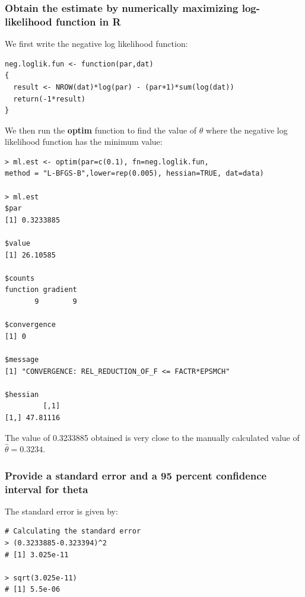 \documentclass[12pt,letterpaper,titlepage,en-US]{article}
\begin{document}
\subsubsection{Obtain the estimate by numerically maximizing log-likelihood function in R}
We first write the negative log likelihood function:
\begin{knitrout}
\color{fgcolor}
\begin{kframe}
\begin{verbatim}
neg.loglik.fun <- function(par,dat)
{ 
  result <- NROW(dat)*log(par) - (par+1)*sum(log(dat))
  return(-1*result)
}
\end{verbatim}
\end{kframe}
\end{knitrout}



We then run the \textbf{optim} function to find the value of $\theta$ where the negative log likelihood function has the minimum value:
\begin{knitrout}
\color{fgcolor}
\begin{kframe}
\begin{verbatim}
> ml.est <- optim(par=c(0.1), fn=neg.loglik.fun, 
method = "L-BFGS-B",lower=rep(0.005), hessian=TRUE, dat=data)

> ml.est
$par
[1] 0.3233885

$value
[1] 26.10585

$counts
function gradient 
       9        9 

$convergence
[1] 0

$message
[1] "CONVERGENCE: REL_REDUCTION_OF_F <= FACTR*EPSMCH"

$hessian
         [,1]
[1,] 47.81116
\end{verbatim}
\end{kframe}
\end{knitrout}
The value of 0.3233885 obtained is very close to the manually calculated value of $\hat{\theta
}=0.3234.$


\subsubsection{Provide a standard error and a 95 percent confidence interval for theta}
The standard error is given by:
\begin{knitrout}
\color{fgcolor}
\begin{kframe}
\begin{verbatim}
# Calculating the standard error
> (0.3233885-0.323394)^2
# [1] 3.025e-11

> sqrt(3.025e-11)
# [1] 5.5e-06
\end{verbatim}
\end{kframe}
\end{knitrout}
\end{document}

